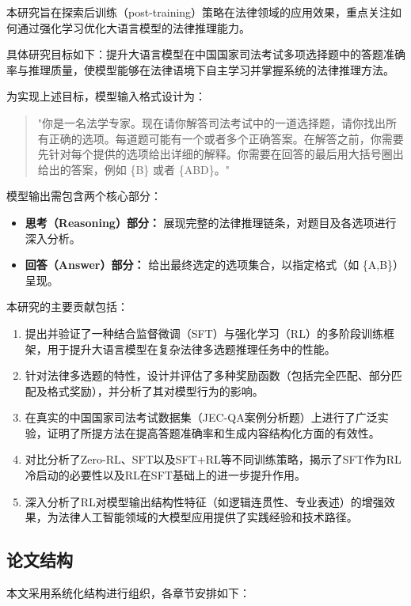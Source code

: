 \documentclass{pkuthesis}
\begin{document}
本研究旨在探索后训练（post-training）策略在法律领域的应用效果，重点关注如何通过强化学习优化大语言模型的法律推理能力。

具体研究目标如下：提升大语言模型在中国国家司法考试多项选择题中的答题准确率与推理质量，使模型能够在法律语境下自主学习并掌握系统的法律推理方法。

为实现上述目标，模型输入格式设计为：
\begin{quote}
    "你是一名法学专家。现在请你解答司法考试中的一道选择题，请你找出所有正确的选项。每道题可能有一个或者多个正确答案。在解答之前，你需要先针对每个提供的选项给出详细的解释。你需要在回答的最后用大括号圈出给出的答案，例如 \{B\} 或者 \{ABD\}。"
\end{quote}

模型输出需包含两个核心部分：
\begin{itemize}
\item \textbf{思考（Reasoning）部分：} 展现完整的法律推理链条，对题目及各选项进行深入分析。
\item \textbf{回答（Answer）部分：} 给出最终选定的选项集合，以指定格式（如 \{A,B\}）呈现。
\end{itemize}

本研究的主要贡献包括：
\begin{enumerate}
    \item 提出并验证了一种结合监督微调（SFT）与强化学习（RL）的多阶段训练框架，用于提升大语言模型在复杂法律多选题推理任务中的性能。
    \item 针对法律多选题的特性，设计并评估了多种奖励函数（包括完全匹配、部分匹配及格式奖励），并分析了其对模型行为的影响。
    \item 在真实的中国国家司法考试数据集（JEC-QA案例分析题）上进行了广泛实验，证明了所提方法在提高答题准确率和生成内容结构化方面的有效性。
    \item 对比分析了Zero-RL、SFT以及SFT+RL等不同训练策略，揭示了SFT作为RL冷启动的必要性以及RL在SFT基础上的进一步提升作用。
    \item 深入分析了RL对模型输出结构性特征（如逻辑连贯性、专业表述）的增强效果，为法律人工智能领域的大模型应用提供了实践经验和技术路径。
\end{enumerate}

\subsection{论文结构}

本文采用系统化结构进行组织，各章节安排如下：
\end{document}

